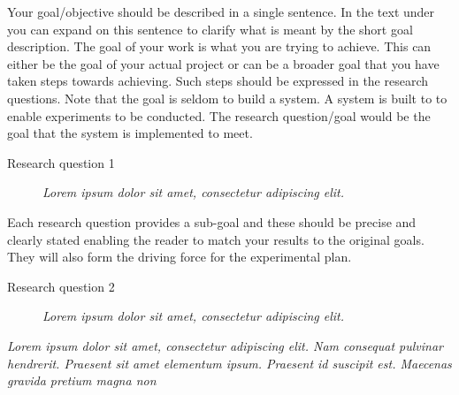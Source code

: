 Your goal/objective should be described in a single sentence. In the text under you can expand on this sentence to clarify what is meant by the short goal description. 
The goal of your work is what you are trying to achieve. This can either be the goal of your actual project or can be a broader goal that you have taken steps towards achieving. Such steps should be expressed in the research questions. 
Note that the goal is seldom to build a system. A system is built to to enable experiments to be conducted. The research question/goal would be the goal that the system is implemented to meet.  


\begin{description}
\item[Research question 1] {\it Lorem ipsum dolor sit amet, consectetur adipiscing elit.}
\end{description}

Each research question provides a sub-goal and these should be precise and clearly stated enabling the reader to match your results to the original goals. They will also form the driving force for the experimental plan. 

\begin{description}
\item[Research question 2] {\it Lorem ipsum dolor sit amet, consectetur adipiscing elit.}
\end{description}

{\it Lorem ipsum dolor sit amet, consectetur adipiscing elit. Nam consequat pulvinar hendrerit. Praesent sit amet elementum ipsum. Praesent id suscipit est. Maecenas gravida pretium magna non }
\fi
